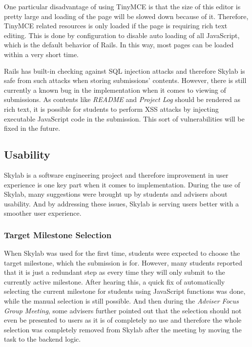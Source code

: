 One particular disadvantage of using TinyMCE is that the size of this editor is pretty large and loading of the page will be slowed down because of it. Therefore, TinyMCE related resources is only loaded if the page is requiring rich text editing. This is done by configuration to disable auto loading of all JavaScript, which is the default behavior of Rails. In this way, most pages can be loaded within a very short time.

Rails has built-in checking against SQL injection attacks and therefore Skylab is safe from such attacks when storing submissions' contents\cite{citation11}. However, there is still currently a known bug in the implementation when it comes to viewing of submissions. As contents like \textit{README} and \textit{Project Log} should be rendered as rich text, it is possible for students to perform XSS attacks by injecting executable JavaScript code in the submission. This sort of vulnerabilities will be fixed in the future.

\subsection{Usability}

Skylab is a software engineering project and therefore improvement in user experience is one key part when it comes to implementation. During the use of Skylab, many suggestions were brought up by students and advisers about usability. And by addressing these issues, Skylab is serving users better with a smoother user experience.

\subsubsection{Target Milestone Selection}

When Skylab was used for the first time, students were expected to choose the target milestone, which the submission is for. However, many students reported that it is just a redundant step as every time they will only submit to the currently active milestone. After hearing this, a quick fix of automatically selecting the current milestone for students using JavaScript functions was done, while the manual selection is still possible. And then during the \textit{Adviser Focus Group Meeting}, some advisers further pointed out that the selection should not even be presented to users as it is of completely no use and therefore the whole selection was completely removed from Skylab after the meeting by moving the task to the backend logic. 

